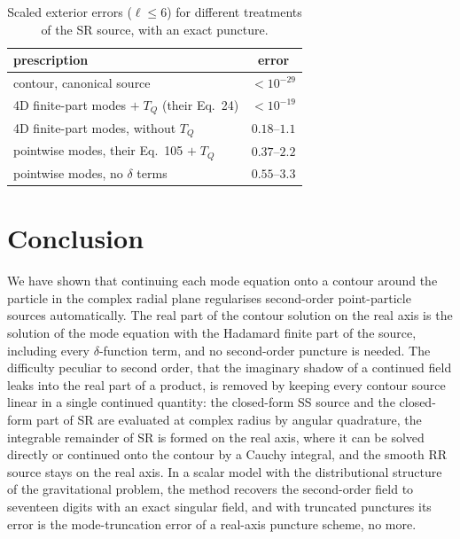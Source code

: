 \documentclass[aps,prd,twocolumn,superscriptaddress,nofootinbib,floatfix]{revtex4-2}
\begin{document}
\begin{table}[t]
\caption{Scaled exterior errors ($\ell\le6$) for different treatments of the SR source, with an exact puncture.}
\label{tab:tq}
\begin{ruledtabular}
\begin{tabular}{lc}
prescription & error\\
\hline
contour, canonical source & $<10^{-29}$\\
4D finite-part modes $+\;T_Q$ (their Eq.~24) & $<10^{-19}$\\
4D finite-part modes, without $T_Q$ & $0.18$--$1.1$\\
pointwise modes, their Eq.~105 $+\;T_Q$ & $0.37$--$2.2$\\
pointwise modes, no $\delta$ terms & $0.55$--$3.3$\\
\end{tabular}
\end{ruledtabular}
\end{table}

\section{Conclusion}\label{sec:conclusion}

We have shown that continuing each mode equation onto a contour around the particle in the complex radial plane regularises second-order point-particle sources automatically.
The real part of the contour solution on the real axis is the solution of the mode equation with the Hadamard finite part of the source, including every $\delta$-function term, and no second-order puncture is needed.
The difficulty peculiar to second order, that the imaginary shadow of a continued field leaks into the real part of a product, is removed by keeping every contour source linear in a single continued quantity: the closed-form SS source and the closed-form part of SR are evaluated at complex radius by angular quadrature, the integrable remainder of SR is formed on the real axis, where it can be solved directly or continued onto the contour by a Cauchy integral, and the smooth RR source stays on the real axis.
In a scalar model with the distributional structure of the gravitational problem, the method recovers the second-order field to seventeen digits with an exact singular field, and with truncated punctures its error is the mode-truncation error of a real-axis puncture scheme, no more.
\end{document}
